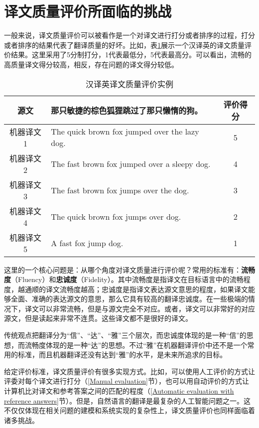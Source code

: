 \section{译文质量评价所面临的挑战}

\parinterval 一般来说，译文质量评价可以被看作是一个对译文进行打分或者排序的过程，打分或者排序的结果代表了翻译质量的好坏。比如，表\ref{tab:4-1}展示一个汉译英的译文质量评价结果。这里采用了5分制打分，1代表最低分，5代表最高分。可以看出，流畅的高质量译文得分较高，相反，存在问题的译文得分较低。

\begin{table}[htp]{
\begin{center}
\caption{汉译英译文质量评价实例}
{
\begin{tabular}{c|l|c}
源文 & 那只敏捷的棕色狐狸跳过了那只懒惰的狗。 & 评价得分 \\
\hline
\rule{0pt}{10pt} 机器译文1 & The quick brown fox jumped over the lazy dog. & 5 \\
\rule{0pt}{10pt} 机器译文2 & The fast brown fox jumped over a sleepy dog. & 4 \\
\rule{0pt}{10pt} 机器译文3 & The fast brown fox jumps over the dog. & 3 \\
\rule{0pt}{10pt} 机器译文4 & The quick brown fox jumps over dog. & 2 \\
\rule{0pt}{10pt} 机器译文5 & A fast fox jump dog. & 1 \\
\end{tabular}
\label{tab:4-1}
}
\end{center}
}\end{table}

\parinterval 这里的一个核心问题是：从哪个角度对译文质量进行评价呢？常用的标准有：{\small\sffamily\bfseries{流畅度}}（Fluency）和{\small\sffamily\bfseries{忠诚度}}（Fidelity）。其中流畅度是指译文在目标语言中的流畅程度，越通顺的译文流畅度越高；忠诚度是指译文表达源文意思的程度，如果译文能够全面、准确的表达源文的意思，那么它具有较高的翻译忠诚度。在一些极端的情况下，译文可以非常流畅，但是与源文完全不对应。或者，译文可以非常好的对应源文，但是读起来非常不连贯。这些译文都不是很好的译文。

\parinterval 传统观点把翻译分为“信”、“达”、“雅”三个层次，而忠诚度体现的是一种“信”的思想，而流畅度体现的是一种“达”的思想。不过“雅”在机器翻译评价中还不是一个常用的标准，而且机器翻译还没有达到“雅”的水平，是未来所追求的目标。

\parinterval 给定评价标准，译文质量评价有很多实现方式。比如，可以使用人工评价的方式让评委对每个译文进行打分（\ref{Manual evaluation}节），也可以用自动评价的方式让计算机比对译文和参考答案之间的匹配的程度（\ref{Automatic evaluation with reference answers}节）。但是，自然语言的翻译是最复杂的人工智能问题之一。这不仅仅体现在相关问题的建模和系统实现的复杂性上，译文质量评价也同样面临着诸多挑战。

